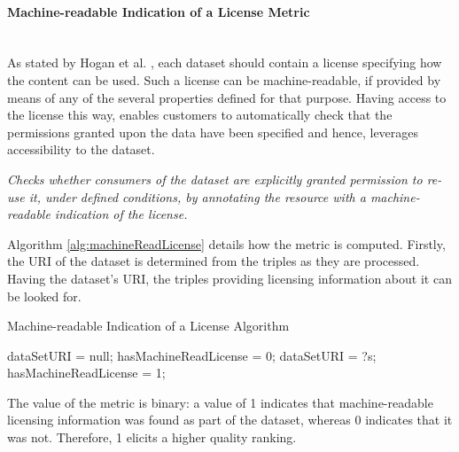 \paragraph{Machine-readable Indication of a License Metric} ~\\ %
As stated by Hogan et al. \cite{Hogan2012:LDC}, each dataset should contain a license specifying how the content can be used. Such a license can be machine-readable, if provided by means of any of the several properties defined for that purpose. Having access to the license this way, enables customers to automatically check that the permissions granted upon the data have been specified and hence, leverages accessibility to the dataset.

\begin{mdframed}[style=metricdefinition]
\emph{Checks whether consumers of the dataset are explicitly granted permission to re-use it, under defined conditions, by annotating the resource with a machine-readable indication of the license.}
\end{mdframed}

Algorithm \ref{alg:machineReadLicense} details how the metric is computed. Firstly, the URI of the dataset is determined from the triples as they are processed. Having the dataset's URI, the triples providing licensing information about it can be looked for.
\begin{algorithm}
\caption{Machine-readable Indication of a License Algorithm} \label{alg:machineReadLicense}
\begin{algorithmic}[1]
\State dataSetURI = null;
\State hasMachineReadLicense = 0;
\EndProcedure
{}
\State dataSetURI = ?s;
\EndIf
{} 
\State hasMachineReadLicense = 1;
\EndIf ~\\
\EndProcedure
\end{algorithmic}
\end{algorithm}
The value of the metric is binary: a value of 1 indicates that machine-readable licensing information was found as part of the dataset, whereas 0 indicates that it was not. Therefore, 1 elicits a higher quality ranking.






